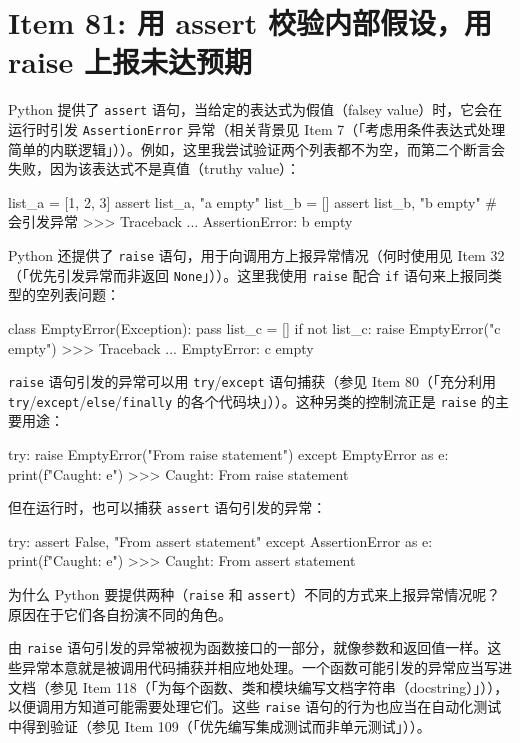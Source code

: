 \section{Item 81: 用 assert 校验内部假设，用 raise 上报未达预期}

Python 提供了 \texttt{assert} 语句，当给定的表达式为假值（falsey value）时，它会在运行时引发 \texttt{AssertionError} 异常（相关背景见 Item 7（「考虑用条件表达式处理简单的内联逻辑」））。例如，这里我尝试验证两个列表都不为空，而第二个断言会失败，因为该表达式不是真值（truthy value）：

\begin{codebox}[python]
list_a = [1, 2, 3]
assert list_a, "a empty"
list_b = []
assert list_b, "b empty"  # 会引发异常
>>>
Traceback ...
AssertionError: b empty
\end{codebox}

Python 还提供了 \texttt{raise} 语句，用于向调用方上报异常情况（何时使用见 Item 32（「优先引发异常而非返回 \texttt{None}」））。这里我使用 \texttt{raise} 配合 \texttt{if} 语句来上报同类型的空列表问题：

\begin{codebox}[python]
class EmptyError(Exception):
    pass
list_c = []
if not list_c:
    raise EmptyError("c empty")
>>>
Traceback ...
EmptyError: c empty
\end{codebox}

\texttt{raise} 语句引发的异常可以用 \texttt{try}/\texttt{except} 语句捕获（参见 Item 80（「充分利用 \texttt{try}/\texttt{except}/\texttt{else}/\texttt{finally} 的各个代码块」））。这种另类的控制流正是 \texttt{raise} 的主要用途：

\begin{codebox}[python]
try:
    raise EmptyError("From raise statement")
except EmptyError as e:
    print(f"Caught: {e}")
>>>
Caught: From raise statement
\end{codebox}

但在运行时，也可以捕获 \texttt{assert} 语句引发的异常：

\begin{codebox}[python]
try:
    assert False, "From assert statement"
except AssertionError as e:
    print(f"Caught: {e}")
>>>
Caught: From assert statement
\end{codebox}

为什么 Python 要提供两种（\texttt{raise} 和 \texttt{assert}）不同的方式来上报异常情况呢？原因在于它们各自扮演不同的角色。

由 \texttt{raise} 语句引发的异常被视为函数接口的一部分，就像参数和返回值一样。这些异常本意就是被调用代码捕获并相应地处理。一个函数可能引发的异常应当写进文档（参见 Item 118（「为每个函数、类和模块编写文档字符串（docstring）」）），以便调用方知道可能需要处理它们。这些 \texttt{raise} 语句的行为也应当在自动化测试中得到验证（参见 Item 109（「优先编写集成测试而非单元测试」））。

